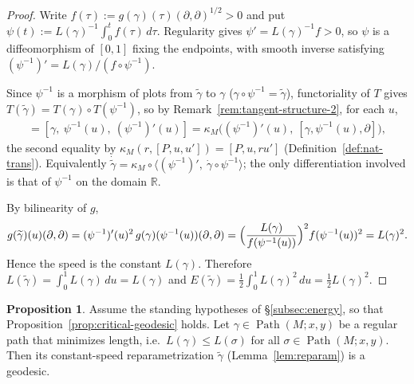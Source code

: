 \documentclass{amsart}
\newcommand{\R}{\mathbb{R}}
\DeclareMathOperator{\Path}{Path}
\theoremstyle{definition}
\newtheorem{prop}[thm]{Proposition}
\begin{document}
\begin{proof}
  Write $f(\tau) := g(\gamma)(\tau)(\partial, \partial)^{1/2} > 0$ and put
  $\psi(t) := L(\gamma)^{-1} \int_0^t f(\tau)\, d\tau$. Regularity gives
  $\psi' = L(\gamma)^{-1} f > 0$, so $\psi$ is a diffeomorphism of $[0,1]$ fixing
  the endpoints, with smooth inverse satisfying
  $(\psi^{-1})' = L(\gamma) / (f \circ \psi^{-1})$.

  Since $\psi^{-1}$ is a morphism of plots from $\widetilde\gamma$ to $\gamma$
  ($\gamma \circ \psi^{-1} = \widetilde\gamma$), functoriality of $T$ gives
  $T(\widetilde\gamma) = T(\gamma) \circ T(\psi^{-1})$, so by
  Remark~\ref{rem:tangent-structure-2}, for each $u$,
  \begin{align*}
    [\widetilde\gamma, u, \partial]
      = [\gamma,\ \psi^{-1}(u),\ (\psi^{-1})'(u)]
      = \kappa_M\bigl( (\psi^{-1})'(u),\ [\gamma, \psi^{-1}(u), \partial] \bigr),
  \end{align*}
  the second equality by
  $\kappa_M(r, [P, u, u']) = [P, u, r u']$
  (Definition~\ref{def:nat-trans}). Equivalently
  $\dot{\widetilde\gamma}
   = \kappa_M \circ \langle (\psi^{-1})',\ \dot\gamma \circ \psi^{-1} \rangle$;
  the only differentiation involved is that of $\psi^{-1}$ on the domain $\R$.

  By bilinearity of $g$,
  \begin{align*}
    g(\widetilde\gamma)(u)(\partial, \partial)
      = (\psi^{-1})'(u)^2 \, g(\gamma)(\psi^{-1}(u))(\partial, \partial)
      = \Bigl( \frac{L(\gamma)}{f(\psi^{-1}(u))} \Bigr)^{2} f(\psi^{-1}(u))^2
      = L(\gamma)^2 .
  \end{align*}
  Hence the speed is the constant $L(\gamma)$. Therefore
  $L(\widetilde\gamma) = \int_0^1 L(\gamma)\, du = L(\gamma)$ and
  $E(\widetilde\gamma) = \tfrac12 \int_0^1 L(\gamma)^2\, du = \tfrac12 L(\gamma)^2$.
\end{proof}

\begin{prop}\label{prop:minimizer-geodesic}
  Assume the standing hypotheses of \S\ref{subsec:energy}, so that
  Proposition~\ref{prop:critical-geodesic} holds. Let
  $\gamma \in \Path(M; x, y)$ be a regular path that minimizes length, i.e.\
  $L(\gamma) \le L(\sigma)$ for all $\sigma \in \Path(M; x, y)$. Then its
  constant-speed reparametrization $\widetilde\gamma$ (Lemma~\ref{lem:reparam})
  is a geodesic.
\end{prop}
\end{document}
